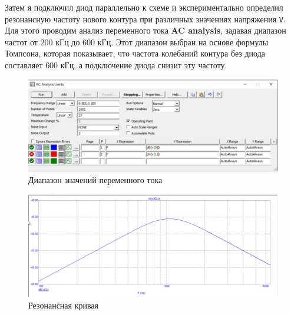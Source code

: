 Затем я подключил диод параллельно к схеме и экспериментально определил резонансную частоту нового контура при различных значениях напряжения \texttt{V}. Для этого проводим анализ переменного тока \textbf{AC analysis}, задавая диапазон частот от $200$ кГц до $600$ кГц. Этот диапазон выбран на основе формулы Томпсона, которая показывает, что частота колебаний контура без диода составляет $600$ кГц, а подключение диода снизит эту частоту.
\begin{figure}[H]
	\centering
	\includegraphics[width=1\textwidth]{img/04.jpg}
	\captionsetup{font=footnotesize}
	\caption{Диапазон значений переменного тока}
	\label{fig:04}
\end{figure}

\begin{figure}[H]
	\centering
	\includegraphics[width=1\textwidth]{img/05.jpg}
	\captionsetup{font=footnotesize}
	\caption{Резонансная кривая}
	\label{fig:05}
\end{figure}


